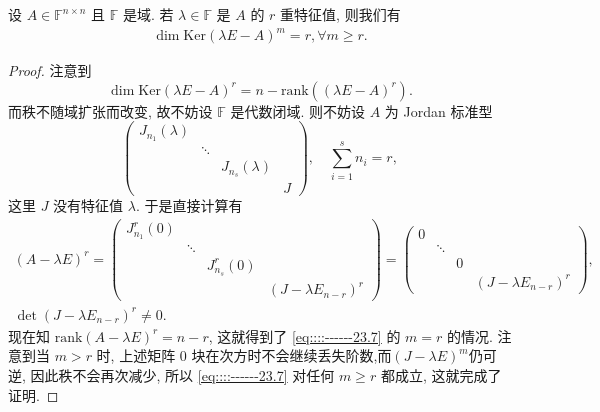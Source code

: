 \documentclass[../../main.tex]{subfiles}%
\begin{document}
\begin{lemma}[根子空间维数]\label{lemma:根子空间维数}
设 \( A \in \mathbb{F}^{n \times n} \) 且 \( \mathbb{F} \) 是域. 若 \( \lambda \in \mathbb{F} \) 是 \( A \) 的 \( r \) 重特征值, 则我们有
\begin{align}
\dim \mathrm{Ker} \left( \lambda E - A \right)^m = r, \forall m \geqslant r. \label{eq::::------23.7}
\end{align}
\end{lemma}
\begin{proof}

注意到
\[
\dim \mathrm{Ker} \left( \lambda E - A \right)^r = n - \mathrm{rank} \left( \left( \lambda E - A \right)^r \right).
\]
而秩不随域扩张而改变, 故不妨设 \( \mathbb{F} \) 是代数闭域. 则不妨设 \( A \) 为 Jordan 标准型
\[
\begin{pmatrix}
J_{n_1} \left( \lambda \right) & & & \\
& \ddots & & \\
& & J_{n_s} \left( \lambda \right) & \\
& & & J
\end{pmatrix}, \quad \sum_{i=1}^s n_i = r,
\]
这里 \( J \) 没有特征值 \( \lambda \). 于是直接计算有
\begin{gather*}
\left( A - \lambda E \right)^r = \begin{pmatrix}
J_{n_1}^r \left( 0 \right) & & & \\
& \ddots & & \\
& & J_{n_s}^r \left( 0 \right) & \\
& & & \left( J - \lambda E_{n-r} \right)^r
\end{pmatrix} = \begin{pmatrix}
0 & & & \\
& \ddots & & \\
& & 0 & \\
& & & \left( J - \lambda E_{n-r} \right)^r
\end{pmatrix}, 
\\
\det \left( J - \lambda E_{n-r} \right)^r \neq 0.
\end{gather*}
现在知 \( \mathrm{rank} \left( A - \lambda E \right)^r = n - r \), 这就得到了 \eqref{eq::::------23.7} 的 \( m = r \) 的情况. 注意到当 \( m > r \) 时, 上述矩阵 \( 0 \) 块在次方时不会继续丢失阶数,而$\left( J - \lambda E \right)^m$仍可逆, 因此秩不会再次减少, 所以 \eqref{eq::::------23.7} 对任何 \( m \geqslant r \) 都成立, 这就完成了证明.


\end{proof}
\end{document}
